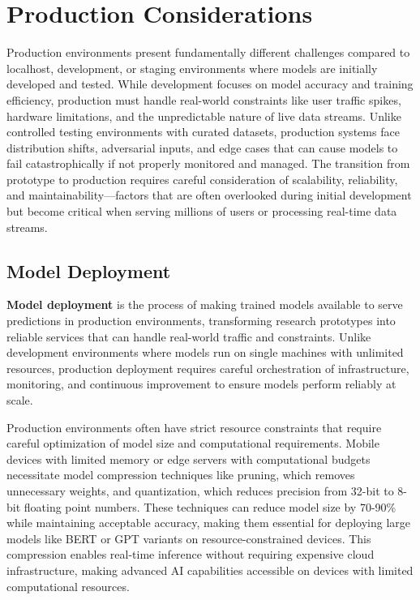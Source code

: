 
\section{Production Considerations }
\label{sec:production}

Production environments present fundamentally different challenges compared to localhost, development, or staging environments where models are initially developed and tested. While development focuses on model accuracy and training efficiency, production must handle real-world constraints like user traffic spikes, hardware limitations, and the unpredictable nature of live data streams. Unlike controlled testing environments with curated datasets, production systems face distribution shifts, adversarial inputs, and edge cases that can cause models to fail catastrophically if not properly monitored and managed. The transition from prototype to production requires careful consideration of scalability, reliability, and maintainability—factors that are often overlooked during initial development but become critical when serving millions of users or processing real-time data streams.

\subsection{Model Deployment}

\textbf{Model deployment} is the process of making trained models available to serve predictions in production environments, transforming research prototypes into reliable services that can handle real-world traffic and constraints. Unlike development environments where models run on single machines with unlimited resources, production deployment requires careful orchestration of infrastructure, monitoring, and continuous improvement to ensure models perform reliably at scale.

Production environments often have strict resource constraints that require careful optimization of model size and computational requirements. Mobile devices with limited memory or edge servers with computational budgets necessitate model compression techniques like pruning, which removes unnecessary weights, and quantization, which reduces precision from 32-bit to 8-bit floating point numbers. These techniques can reduce model size by 70-90\% while maintaining acceptable accuracy, making them essential for deploying large models like BERT or GPT variants on resource-constrained devices. This compression enables real-time inference without requiring expensive cloud infrastructure, making advanced AI capabilities accessible on devices with limited computational resources.

